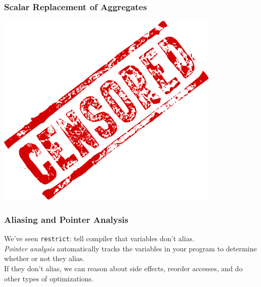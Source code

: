 \begin{frame}[fragile]
  \frametitle{Scalar Replacement of Aggregates}

\begin{center}
  \includegraphics[width=0.8\textwidth]{images/Censored_rubber_stamp.png}
\end{center}
\end{frame}

\begin{frame}
  \frametitle{Aliasing and Pointer Analysis}

  

     We've seen {\tt restrict}: tell compiler that variables don't
      alias.\\[1em]

    {\it Pointer analysis} automatically tracks the variables in your program to
      determine whether or not they alias.\\[1em]
    
    If they don't alias, we can reason about side effects, reorder
    accesses, and do other types of optimizations.
  

\end{frame}

